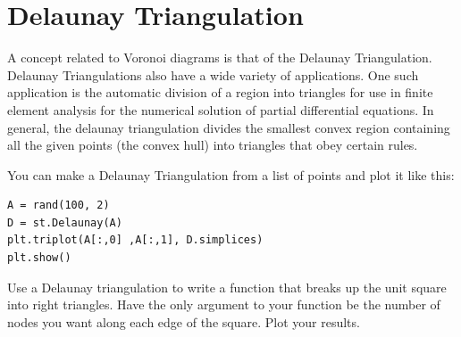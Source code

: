 \section*{Delaunay Triangulation}

A concept related to Voronoi diagrams is that of the Delaunay Triangulation.
Delaunay Triangulations also have a wide variety of applications.
One such application is the automatic division of a region into triangles for use in finite element analysis for the numerical solution of partial differential equations.
In general, the delaunay triangulation divides the smallest convex region containing all the given points (the convex hull) into triangles that obey certain rules.

You can make a Delaunay Triangulation from a list of points and plot it like this:
\begin{lstlisting}
A = rand(100, 2)
D = st.Delaunay(A)
plt.triplot(A[:,0] ,A[:,1], D.simplices)
plt.show()
\end{lstlisting}

\begin{problem}
Use a Delaunay triangulation to write a function that breaks up the unit square into right triangles.
Have the only argument to your function be the number of nodes you want along each edge of the square.
Plot your results.
\end{problem}

